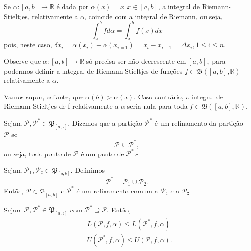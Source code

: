\documentclass[analysis_notes.tex]{subfiles}
\begin{document}
Se \(\alpha :[a, b]\rightarrow \mathbb{R}\) é dada por \(\alpha (x) = x, x\in[a, b]\), a integral de Riemann-Stieltjes, relativamente a \(\alpha \), coincide
com a integral de Riemann, ou seja,
\[
	\int_{a}^{b}f d\alpha = \int_{a}^{b}f(x)dx
\]
pois, neste caso, \(\delta x_{i}=\alpha (x_{i}) - \alpha (x_{i=1}) = x_{i} - x_{i-1} = \Delta x_{i}, 1\leq i\leq n\).

Observe que \(\alpha :[a, b]\rightarrow \mathbb{R}\) só precisa ser não-decrescente em \([a, b],\) para
podermos definir a integral de Riemann-Stieltjes de fun\c cões \(f\in \mathfrak{B}([a, b], \mathbb{R})\) relativamente a \(\alpha .\)

Vamos supor, adiante, que \(\alpha (b) > \alpha (a).\) Caso contrário, a integral de Riemann-Stieltjes de f
relativamente a \(\alpha \) seria nula para toda \(f\in \mathfrak{B}([a, b], \mathbb{R})\).
\begin{def*}
	Sejam \(\mathcal{P}, \mathcal{P}^{*}\in \mathfrak{P}_{[a, b]}\). Dizemos que a parti\c cão \(\mathcal{P}^{*}\) é um
	refinamento da parti\c cão \(\mathcal{P}\) se
	\[
		\mathcal{P}\subseteq{\mathcal{P}^{*},}
	\]
	ou seja, todo ponto de \(\mathcal{P}\) é um ponto de \(\mathcal{P}^{*}. \square\)
\end{def*}
Sejam \(\mathcal{P}_{1}, \mathcal{P}_{2}\in \mathfrak{P}_{[a, b]}.\) Definimos
\[
	\mathcal{P}^{*} = \mathcal{P}_{1}\cup \mathcal{P}_{2}.
\]
Então, \(\mathcal{P}\in \mathfrak{P}_{[a, b]}\) e \(\mathcal{P}^{*}\) é um refinamento comum
a \(\mathcal{P}_{1}\) e a \(\mathcal{P}_{2}.\)
\begin{prop*}
	Sejam \(\mathcal{P}, \mathcal{P}^{*}\in \mathfrak{P}_{[a, b]}\) com \(\mathcal{P}^{*}\supseteq{\mathcal{P}.}\) Então,
	\begin{align*}
		 & L(\mathcal{P}, f, \alpha )\leq L(\mathcal{P}^{*}, f, \alpha )  \\
		 & U(\mathcal{P}^{*}, f, \alpha )\leq U(\mathcal{P}, f, \alpha ).
	\end{align*}
\end{prop*}
\end{document}
